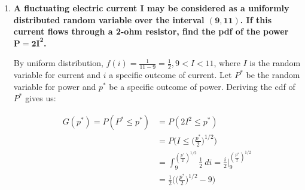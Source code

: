 \documentclass[10pt, oneside]{article}
\begin{document}
\begin{enumerate}[label=5.\arabic*]
\begin{align*}
G(a) = P(A \leq a) &= P(4 \pi r^2 \leq a) \\
&= P\Big( r \leq \Big( \frac{1}{4 \pi} a \Big)^{1/2} \Big) \\
&= \int^{(\frac{1}{4 \pi} a)^{1/2}}_0 6r(1 - r) \ dr = 3r^2 - 2r^3 \Big|^{(\frac{1}{4\pi} a)^{1/2}}_0 \\
&= 3 \Big( \frac{1}{4 \pi} a \Big) - 2 \Big( \frac{1}{4 \pi} a \Big)^{3/2}
\end{align*}

And now differentiating with respect to $a$ to find the pdf of $A$:

\begin{align*}
G'(a) = g(a) &= \frac{3}{4 \pi} - 3 \Big( \frac{1}{4 \pi} a \Big)^{1/2} \Big( \frac{1}{4 \pi} \Big) \\
&= \boxed{ \frac{3}{4 \pi} \Big( 1 - \Big( \frac{1}{4 \pi} a \Big)^{1/2} \Big) }
\end{align*}

For $A(r) = 4 \pi r^2$ over $0 < r < 1$, we have $0 < A(r) < 4 \pi$. Then $g(a) \geq 0$ over this interval, and $\int^{4\pi}_0 \frac{3}{4 \pi} \Big( 1 - \Big( \frac{1}{4 \pi} a \Big)^{1/2} \Big) \ da = \boxed{1}$, ascertaining that $g(a)$ is a pdf.

\item  \begin{tcolorbox}[
  colback=Cerulean!5!white,
  colframe=Cerulean!75!black]
\textbf{A fluctuating electric current $\bm{I}$ may be considered as a uniformly distributed random variable over the interval $\bm{(9, 11)}$. If this current flows through a 2-ohm resistor, find the pdf of the power $\bm{P = 2 I^2}$.}
\end{tcolorbox}

By uniform distribution, $f(i) = \frac{1}{11 - 9} = \frac{1}{2}, 9 < I < 11$, where $I$ is the random variable for current and $i$ a specific outcome of current. Let $P^*$ be the random variable for power and $p^*$ be a specific outcome of power. Deriving the cdf of $P^*$ gives us:

\begin{align*}
G(p^*) = P(P^* \leq p^*) &= P(2 I^2 \leq p^*) \\
&= P \Big(I \leq \Big( \frac{p^*}{2} \Big)^{1/2} \Big) \\
&= \int^{( \frac{p^*}{2} )^{1/2}}_9 \frac{1}{2} \ di = \frac{i}{2} \Big|^{(\frac{p^*}{2} )^{1/2}}_9 \\
&= \frac{1}{2} \Big( \Big( \frac{p^*}{2} \Big)^{1/2} - 9 \Big)
\end{align*}


\end{enumerate}
\end{document}
